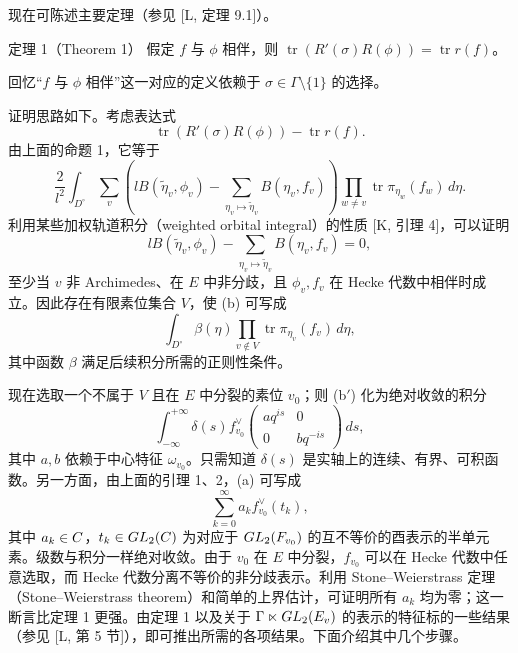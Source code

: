 现在可陈述主要定理（参见 [L, 定理 9.1]）。

\begin{originaltheorem}{定理 1（Theorem 1）}
假定 $f$ 与 $\phi$ 相伴，则 $\operatorname{tr}(R'(\sigma)R(\phi))=\operatorname{tr}r(f)$。
\end{originaltheorem}

回忆“$f$ 与 $\phi$ 相伴”这一对应的定义依赖于 $\sigma\in\Gamma\setminus\{1\}$ 的选择。

证明思路如下。考虑表达式
\begin{equation}
 \operatorname{tr}(R'(\sigma)R(\phi))-\operatorname{tr}r(f).
 \tag{a}
\end{equation}
由上面的命题 1，它等于
\begin{equation}
 \frac2{l^2}\int_{D^\circ}\sum_v
 \left(lB(\widetilde\eta_v,\phi_v)
 -\sum_{\eta_v\mapsto\widetilde\eta_v}B(\eta_v,f_v)\right)
 \prod_{w\ne v}\operatorname{tr}\pi_{\eta_w}(f_w)\,d\eta.
 \tag{b}
\end{equation}
利用某些加权轨道积分（weighted orbital integral）的性质 [K, 引理 4]，可以证明
\[
 lB(\widetilde\eta_v,\phi_v)
 -\sum_{\eta_v\mapsto\widetilde\eta_v}B(\eta_v,f_v)=0,
\]
至少当 $v$ 非 Archimedes、在 $E$ 中非分歧，且 $\phi_v,f_v$ 在 Hecke 代数中相伴时成立。因此存在有限素位集合 $V$，使 (b) 可写成
\begin{equation}
 \int_{D^\circ}\beta(\eta)\prod_{v\notin V}
 \operatorname{tr}\pi_{\eta_v}(f_v)\,d\eta,
 \tag{b$'$}
\end{equation}
其中函数 $\beta$ 满足后续积分所需的正则性条件。

现在选取一个不属于 $V$ 且在 $E$ 中分裂的素位 $v_0$；则 (b$'$) 化为绝对收敛的积分
\begin{equation}
 \int_{-\infty}^{+\infty}\delta(s)f_{v_0}^\vee
 \begin{pmatrix}aq^{is}&0\\0&bq^{-is}\end{pmatrix}\,ds,
 \tag{b$''$}
\end{equation}
其中 $a,b$ 依赖于中心特征 $\omega_{v_0}$。只需知道 $\delta(s)$ 是实轴上的连续、有界、可积函数。另一方面，由上面的引理 1、2，(a) 可写成
\begin{equation}
 \sum_{k=0}^\infty a_kf_{v_0}^\vee(t_k),
 \tag{a$''$}
\end{equation}
其中 $a_k\in C$，$t_k\in GL_2(C)$ 为对应于 $GL_2(F_{v_0})$ 的互不等价的酉表示的半单元素。级数与积分一样绝对收敛。由于 $v_0$ 在 $E$ 中分裂，$f_{v_0}$ 可以在 Hecke 代数中任意选取，而 Hecke 代数分离不等价的非分歧表示。利用 Stone--Weierstrass 定理（Stone--Weierstrass theorem）和简单的上界估计，可证明所有 $a_k$ 均为零；这一断言比定理 1 更强。由定理 1 以及关于 $\Gamma\ltimes GL_2(E_v)$ 的表示的特征标的一些结果（参见 [L, 第 5 节]），即可推出所需的各项结果。下面介绍其中几个步骤。

